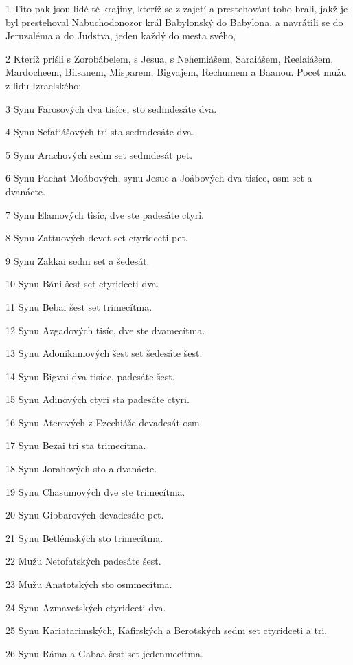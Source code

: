 \par 1 Tito pak jsou lidé té krajiny, kteríž se z zajetí a prestehování toho brali, jakž je byl prestehoval Nabuchodonozor král Babylonský do Babylona, a navrátili se do Jeruzaléma a do Judstva, jeden každý do mesta svého,
\par 2 Kteríž prišli s Zorobábelem, s Jesua, s Nehemiášem, Saraiášem, Reelaiášem, Mardocheem, Bilsanem, Misparem, Bigvajem, Rechumem a Baanou. Pocet mužu z lidu Izraelského:
\par 3 Synu Farosových dva tisíce, sto sedmdesáte dva.
\par 4 Synu Sefatiášových tri sta sedmdesáte dva.
\par 5 Synu Arachových sedm set sedmdesát pet.
\par 6 Synu Pachat Moábových, synu Jesue a Joábových dva tisíce, osm set a dvanácte.
\par 7 Synu Elamových tisíc, dve ste padesáte ctyri.
\par 8 Synu Zattuových devet set ctyridceti pet.
\par 9 Synu Zakkai sedm set a šedesát.
\par 10 Synu Báni šest set ctyridceti dva.
\par 11 Synu Bebai šest set trimecítma.
\par 12 Synu Azgadových tisíc, dve ste dvamecítma.
\par 13 Synu Adonikamových šest set šedesáte šest.
\par 14 Synu Bigvai dva tisíce, padesáte šest.
\par 15 Synu Adinových ctyri sta padesáte ctyri.
\par 16 Synu Aterových z Ezechiáše devadesát osm.
\par 17 Synu Bezai tri sta trimecítma.
\par 18 Synu Jorahových sto a dvanácte.
\par 19 Synu Chasumových dve ste trimecítma.
\par 20 Synu Gibbarových devadesáte pet.
\par 21 Synu Betlémských sto trimecítma.
\par 22 Mužu Netofatských padesáte šest.
\par 23 Mužu Anatotských sto osmmecítma.
\par 24 Synu Azmavetských ctyridceti dva.
\par 25 Synu Kariatarimských, Kafirských a Berotských sedm set ctyridceti a tri.
\par 26 Synu Ráma a Gabaa šest set jedenmecítma.
